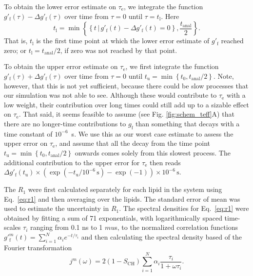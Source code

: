 \documentclass[journal=jpcbfk,manuscript=article,layout=twocolumn]{achemso}
\begin{document}
To obtain the lower error estimate on $\tau_\mathrm e$, we integrate the function
$g'_{\mathrm{f}}(\tau) - \Delta g'_{\mathrm{f}}(\tau)$ over time from $\tau=0$ until $\tau=t_\mathrm l$.
Here
\begin{equation}
t_\mathrm l= \min
\left\{
	\left\{
		t\,|\,g'_{\mathrm{f}}(t) - \Delta g'_{\mathrm{f}}(t) = 0
	\right\},
	\frac{t_\mathrm{anal}}{2}
\right\}.
\end{equation}
That is,
$t_\mathrm l$ is
the first time point at which the lower error estimate of $g'_\mathrm f$ reached zero;
or $t_\mathrm l=t_\mathrm{anal}/2$, if zero was not reached by that point.

To obtain the upper error estimate on $\tau_\mathrm e$, we first integrate the function
$g'_{\mathrm{f}}(\tau) + \Delta g'_{\mathrm{f}}(\tau)$ over time from $\tau=0$ until
$
t_\mathrm u= \min
\left\{
	t_0,
	{t_\mathrm{anal}}/{2}
\right\}.
$
Note, however,
that this is not yet sufficient, because there could be slow processes that our simulation was not
able to see. Although these would contribute to $\tau_\mathrm e$ with a low weight,
their contribution over long times could still add up to a sizable effect on $\tau_\mathrm e$.
%
That said, it seems feasible to assume (see Fig. \ref{fig:schem_teff}A) that there are no longer-time contributions
to $g_\mathrm f$ than something that decays with a time constant of $10^{-6}$~s.
%
We use this as our worst case estimate to assess the upper error on $\tau_\mathrm e$, and
%
assume that all the decay from the time point
$
t_\mathrm u= \min
\left\{
	t_0,
	{t_\mathrm{anal}}/{2}
\right\}
$
onwards comes solely from this slowest process.
%
The additional contribution to the upper error for $\tau_\mathrm e$ then reads
$
\Delta g'_\mathrm f(t_\mathrm u) \times \left(\exp(-t_\mathrm u / 10^{-6}\,\mathrm s) - \exp(-1)\right) \times 10^{-6}\,\mathrm s.
$

The $R_{1}$ were first calculated separately for each lipid in the system using Eq.~\ref{eq:r1} and then averaging over the lipids. The standard error of mean was used to estimate the uncertainty in $R_{1}$. The spectral densities for Eq.~\ref{eq:r1} were obtained by fitting a sum of 71 exponentials, with logarithmically spaced time-scales $\tau_{i}$ ranging from 0.1 ns to 1 $mu$s, to the normalized correlation functions $g'^m_{\mathrm{f}}(t)=\sum_{i=1}^{N}\alpha_{i}e^{-t/\tau_{i}}$ and then calculating the spectral density based of the Fourier transformation\cite{ferreira15}
\begin{equation}
j^m{(\omega)}=2(1-S_\mathrm{CH})\sum_{i=1}^{N}\alpha_{i}\frac{\tau_{i}}{1+\omega\tau_{i}} .
\end{equation}
\end{document}
